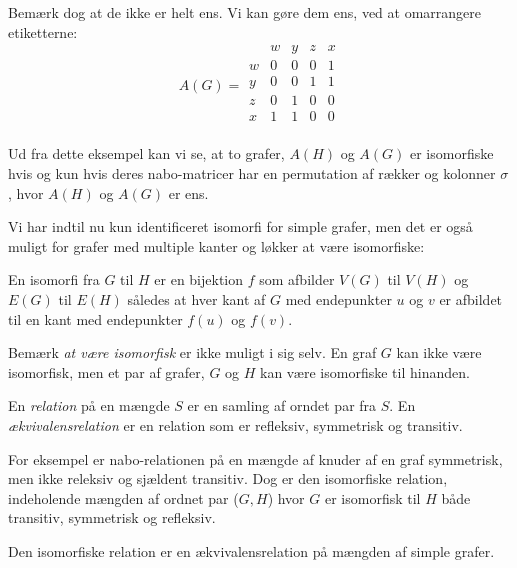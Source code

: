 \begin{example}
\begin{equation}
	\end{equation}
	Bemærk dog at de ikke er helt ens. Vi kan gøre dem ens, ved at omarrangere etiketterne:
	\begin{equation}
		A(G) =
		\begin{array}{c|cccc}
			  & w & y & z & x \\
			\hline
			w & 0 & 0 & 0 & 1 \\
			y & 0 & 0 & 1 & 1 \\
			z & 0 & 1 & 0 & 0 \\
			x & 1 & 1 & 0 & 0 \\
		\end{array}
	\end{equation}
\end{example}

Ud fra dette eksempel kan vi se, at to grafer, $A(H)$ og $A(G)$ er isomorfiske hvis og kun hvis deres nabo-matricer har en permutation af rækker og kolonner \(\sigma\), hvor $A(H)$ og $A(G)$ er ens.

Vi har indtil nu kun identificeret isomorfi for simple grafer, men det er også muligt for grafer med multiple kanter og løkker at være isomorfiske:

\begin{definition}
	En isomorfi fra $G$ til $H$ er en bijektion $f$ som afbilder $V(G)$ til $V(H)$ og $E(G)$ til $E(H)$ således at hver kant af $G$ med endepunkter $u$ og $v$ er afbildet til en kant med endepunkter $f(u)$ og $f(v)$.
\end{definition}

Bemærk \textit{at være isomorfisk} er ikke muligt i sig selv. En graf $G$ kan ikke være isomorfisk, men et par af grafer, $G$ og $H$ kan være isomorfiske til hinanden.

\begin{definition}
	En \textit{relation} på en mængde $S$ er en samling af orndet par fra $S$. En \textit{ækvivalensrelation} er en relation som er refleksiv, symmetrisk og transitiv.
\end{definition}

For eksempel er nabo-relationen på en mængde af knuder af en graf symmetrisk, men ikke releksiv og sjældent transitiv. Dog er den isomorfiske relation, indeholende mængden af ordnet par ($G, H$) hvor $G$ er isomorfisk til $H$ både transitiv, symmetrisk og refleksiv.

\begin{proposition}
	Den isomorfiske relation er en ækvivalensrelation på mængden af simple grafer.
\end{proposition}

